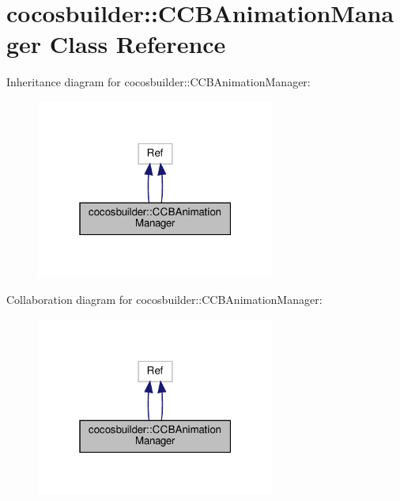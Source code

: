 \hypertarget{classcocosbuilder_1_1CCBAnimationManager}{}\section{cocosbuilder\+:\+:C\+C\+B\+Animation\+Manager Class Reference}
\label{classcocosbuilder_1_1CCBAnimationManager}


Inheritance diagram for cocosbuilder\+:\+:C\+C\+B\+Animation\+Manager\+:
\nopagebreak
\begin{figure}[H]
\begin{center}
\leavevmode
\includegraphics[width=223pt]{classcocosbuilder_1_1CCBAnimationManager__inherit__graph}
\end{center}
\end{figure}


Collaboration diagram for cocosbuilder\+:\+:C\+C\+B\+Animation\+Manager\+:
\nopagebreak
\begin{figure}[H]
\begin{center}
\leavevmode
\includegraphics[width=223pt]{classcocosbuilder_1_1CCBAnimationManager__coll__graph}
\end{center}
\end{figure}
